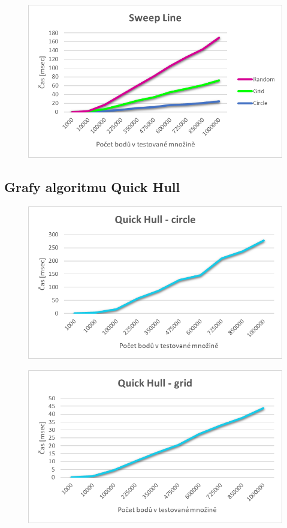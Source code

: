 \documentclass[a4paper, 12pt]{article}
\begin{document}
\begin{figure}[h!]
	\centering
	\includegraphics[width=15cm]{grafy/sl.png}
\end{figure}

\clearpage
\subsection{Grafy algoritmu Quick Hull}
\begin{figure}[h!]
	\centering
	\includegraphics[width=15cm]{grafy/qh_circle.png}
\end{figure}

\begin{figure}[h!]
	\centering
	\includegraphics[width=15cm]{grafy/qh_grid.png}
\end{figure}
\end{document}
